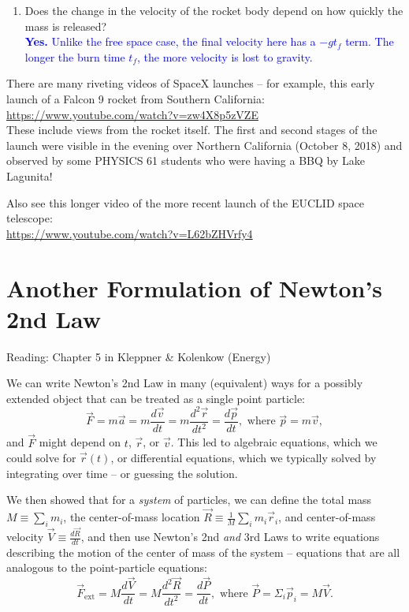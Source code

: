 \documentclass[11pt, letterpaper, openany]{book}
\newenvironment{exercise}[1][Exercise]{%
  \tcolorbox[blanker, breakable, left=1em,
    before skip=1em, after skip=1em,
    borderline west={3pt}{0pt}{PhysNavy},
    colback=PhysCream,
    before upper={\textcolor{PhysNavy}{\sffamily\bfseries #1:}\space}
  ]%
}{%
  \endtcolorbox%
}
\begin{document}
\begin{exercise}[Exercise 6]
\begin{enumerate}[label=(\alph*)]
{\begin{align*}
        \int_0^{v_f} dv_y &= \int_0^{t_f} -g \, dt - u \int_{M_0}^{M_f} \frac{1}{M} dM \\
        v_f &= -gt_f - u \ln\left| \frac{M_f}{M_0} \right| \\
        v_f &= u \ln\left| \frac{M_0}{M_f} \right| - gt_f
    \end{align*}
    }
    \item Does the change in the velocity of the rocket body depend on how quickly the mass is released? \\
    \textcolor{blue}{\textbf{Yes.} Unlike the free space case, the final velocity here has a $-gt_f$ term. The longer the burn time $t_f$, the more velocity is lost to gravity.}
\end{enumerate}
\end{exercise}

There are many riveting videos of SpaceX launches -- for example, this early launch of a Falcon 9 rocket from Southern California: \\
\url{https://www.youtube.com/watch?v=zw4X8p5zVZE} \\
These include views from the rocket itself. The first and second stages of the launch were visible in the evening over Northern California (October 8, 2018) and observed by some PHYSICS 61 students who were having a BBQ by Lake Lagunita!

Also see this longer video of the more recent launch of the EUCLID space telescope: \\
\url{https://www.youtube.com/watch?v=L62bZHVrfy4}

\chapter{Another Formulation of Newton's 2nd Law}

Reading: Chapter 5 in Kleppner \& Kolenkow (Energy)

We can write Newton's 2nd Law in many (equivalent) ways for a possibly extended object that can be treated as a single point particle:
\[ \vec{F} = m\vec{a} = m\frac{d\vec{v}}{dt} = m\frac{d^2\vec{r}}{dt^2} = \frac{d\vec{p}}{dt}, \text{ where } \vec{p} = m\vec{v}, \]
and $\vec{F}$ might depend on $t$, $\vec{r}$, or $\vec{v}$. This led to algebraic equations, which we could solve for $\vec{r}(t)$, or differential equations, which we typically solved by integrating over time -- or guessing the solution.

We then showed that for a \textit{system} of particles, we can define the total mass $M \equiv \sum_i m_i$, the center-of-mass location $\vec{R} \equiv \frac{1}{M}\sum_i m_i\vec{r}_i$, and center-of-mass velocity $\vec{V} \equiv \frac{d\vec{R}}{dt}$, and then use Newton's 2nd \textit{and} 3rd Laws to write equations describing the motion of the center of mass of the system -- equations that are all analogous to the point-particle equations:
\[ \vec{F}_{\text{ext}} = M\frac{d\vec{V}}{dt} = M\frac{d^2\vec{R}}{dt^2} = \frac{d\vec{P}}{dt}, \text{ where } \vec{P} = \Sigma_i\vec{p}_i = M\vec{V}. \]
\end{document}
